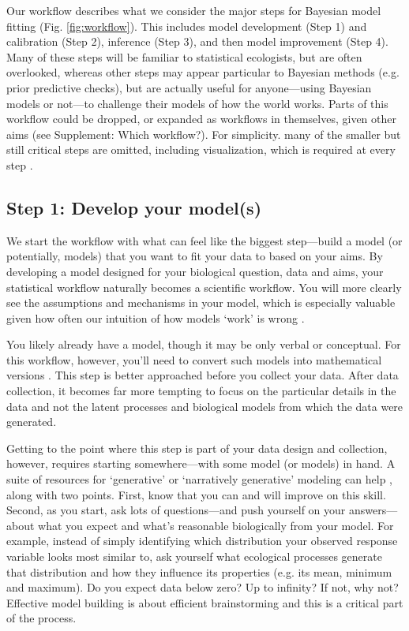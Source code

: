 \documentclass[11pt]{article}
\begin{document}
Our workflow describes what we consider the major steps for Bayesian model fitting (Fig. \ref{fig:workflow}). This includes model development (Step 1) and calibration (Step 2), inference (Step 3), and then model improvement (Step 4). Many of these steps will be familiar to statistical ecologists, but are often overlooked, whereas other steps may appear particular to Bayesian methods (e.g. prior predictive checks), but are actually useful for anyone---using Bayesian models or not---to challenge their models of how the world works. Parts of this workflow could be dropped, or expanded as workflows in themselves, given other aims (see Supplement: Which workflow?). For simplicity. many of the smaller but still critical steps are omitted, including visualization, which is required at every step \citep[and for which there are many good resources, e.g.][]{gabryvis}. 

\subsection*{Step 1: Develop your model(s)} 

We start the workflow with what can feel like the biggest step---build a model (or potentially, models) that you want to fit your data to based on your aims. By developing a model designed for your biological question, data and aims, your statistical workflow naturally becomes a scientific workflow. You will more clearly see the assumptions and mechanisms in your model, which is especially valuable given how often our intuition of how models `work' is wrong \citep{kokko2005useful}.  

You likely already have a model, though it may be only verbal or conceptual. For this workflow, however, you’ll need to convert such models into mathematical versions \citep{servedio2014not}. This step is better approached before you collect your data. After data collection, it becomes far more tempting to focus on the particular details in the data and not the latent processes and biological models from which the data were generated. 

Getting to the point where this step is part of your data design and collection, however, requires starting somewhere---with some model (or models) in hand. A suite of resources for `generative' or `narratively generative' modeling can help \citep{statrethink,betangen}, along with two points. First, know that you can and will improve on this skill. Second, as you start, ask lots of questions---and push yourself on your answers---about what you expect and what's reasonable biologically from your model. For example, instead of simply identifying which distribution your observed response variable looks most similar to, ask yourself what ecological processes generate that distribution and how they influence its properties (e.g. its mean, minimum and maximum). Do you expect data below zero? Up to infinity? If not, why not? Effective model building is about efficient brainstorming and this is a critical part of the process. 
\end{document}
